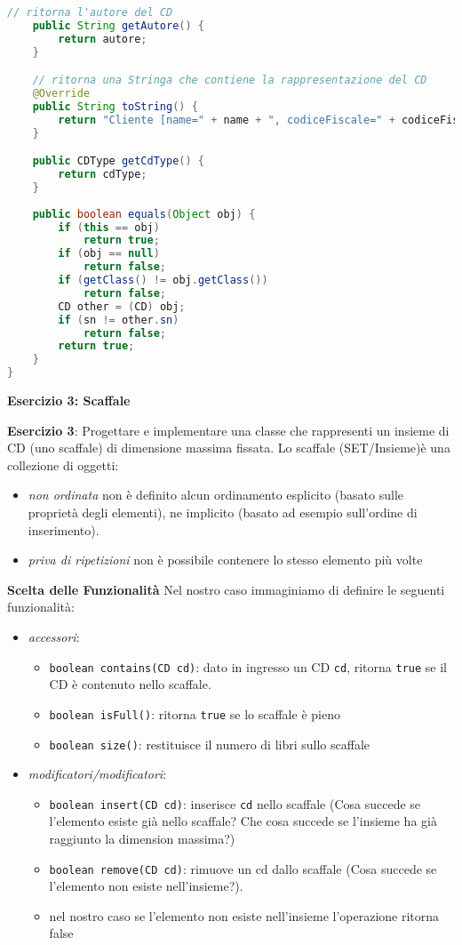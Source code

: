 \documentclass{article}
\begin{document}
\begin{lstlisting}[language=Java,escapechar=|]
	// ritorna l'autore del CD
	public String getAutore() {
		return autore;
	}

	// ritorna una Stringa che contiene la rappresentazione del CD 
	@Override
	public String toString() {
		return "Cliente [name=" + name + ", codiceFiscale=" + codiceFiscale+ "]";
	}

	public CDType getCdType() {
		return cdType;
	}
	
	public boolean equals(Object obj) {
		if (this == obj)
			return true;
		if (obj == null)
			return false;
		if (getClass() != obj.getClass())
			return false;
		CD other = (CD) obj;
		if (sn != other.sn)
			return false;
		return true;
	}
}

\end{lstlisting}

\textbf{Esercizio 3: Scaffale}
\begin{framed}
\textbf{Esercizio 3}: Progettare e implementare una classe che rappresenti un insieme di CD (uno scaffale) di dimensione massima fissata. Lo scaffale (SET/Insieme)\`e una collezione di oggetti:
\begin{itemize}
	\item \emph{non ordinata} non è definito alcun ordinamento esplicito (basato sulle proprietà degli elementi),
	ne implicito (basato ad esempio sull'ordine di inserimento).
	\item \emph{priva di ripetizioni} non è possibile contenere lo stesso elemento più volte
\end{itemize}
\end{framed}

\textbf{Scelta delle Funzionalit\`a}
Nel nostro caso immaginiamo di definire le seguenti funzionalit\`a:
\begin{itemize}
\item \emph{accessori}:
\begin{itemize}
\item \texttt{boolean contains(CD cd)}: dato in ingresso un CD \texttt{cd}, ritorna \texttt{true} se il CD è contenuto nello scaffale.
\item \texttt{boolean isFull()}: ritorna \texttt{true} se lo scaffale \`e pieno
\item \texttt{boolean size()}: restituisce il numero di libri sullo scaffale
\end{itemize}
\item \emph{modificatori/modificatori}:
\begin{itemize}
\item  \texttt{boolean insert(CD cd)}: inserisce \texttt{cd} nello scaffale (Cosa succede se l'elemento esiste gi\`a nello scaffale? Che cosa succede se l'insieme ha gi\`a raggiunto la dimension massima?)
\item \texttt{boolean remove(CD cd)}: rimuove un cd dallo scaffale (Cosa succede se l'elemento non esiste  nell'insieme?).
\item nel nostro caso se l'elemento non esiste nell'insieme l'operazione ritorna false
\end{itemize}
\end{itemize}
\end{document}
